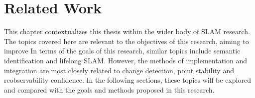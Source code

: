 \section{Related Work}
\label{sec:related_work}

This chapter contextualizes this thesis within the wider body of SLAM research. The topics covered here are relevant to the objectives of this research, aiming to improve 
In terms of the goals of this research, similar topics include semantic identification and lifelong SLAM. However, the methods of implementation and integration are most closely related to change detection, point stability and reobservability confidence. In the following sections, these topics will be explored and compared with the goals and methods proposed in this research.

% 